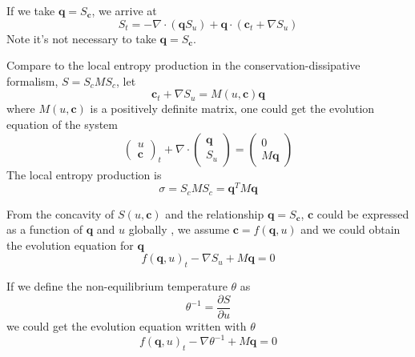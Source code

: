 \documentclass[a4paper]{article}
\begin{document}
If we take $\mathbf{q}= S_\mathbf{c}$, we arrive at
\begin{equation}
S_t = -\nabla \cdot(\mathbf{q} S_u)+\mathbf{q} \cdot (\mathbf{c}_t+\nabla S_u)
\end{equation}
Note it's not necessary to take $\mathbf{q}=S_\mathbf{c}$. 

Compare to the local entropy production in the conservation-dissipative formalism, $S=S_c M S_c$, let
\begin{equation}
\mathbf{c}_t+ \nabla S_u=M(u,\mathbf{c}) \mathbf{q}
\end{equation}
where $M(u,\mathbf{c})$ is a positively definite matrix, one could get the evolution equation of the system
\begin{equation}
\left( \begin{array}{ll} u \\ \mathbf{c} \end{array} \right)_t + \nabla \cdot \left( \begin{array}{ll} \mathbf{q} \\ S_u \end{array} \right) = \left( \begin{array}{ll} 0 \\ M \mathbf{q} \end{array} \right)
\end{equation}
The local entropy production is
\begin{equation}
\sigma = S_c M S_c =\mathbf{q}^T M \mathbf{q}
\end{equation}

From the concavity of $S(u,\mathbf{c})$ and the relationship $\mathbf{q}=S_\mathbf{c}$, $\mathbf{c}$ could be expressed as a function of $\mathbf{q}$ and $u$ globally \cite{friedrichs1971systems}, we assume $\mathbf{c}=f(\mathbf{q},u)$ and we could obtain the evolution equation for $\mathbf{q}$
\begin{equation}
f(\mathbf{q},u)_t-\nabla S_u + M \mathbf{q} = 0
\end{equation}

If we define the non-equilibrium temperature $\theta$ as
\begin{equation}
\theta^{-1}=\frac{\partial S}{\partial u}
\end{equation}
we could get the evolution equation written with $\theta$
\begin{equation}
f(\mathbf{q},u)_t-\nabla \theta^{-1} + M \mathbf{q} = 0
\end{equation}
\end{document}
